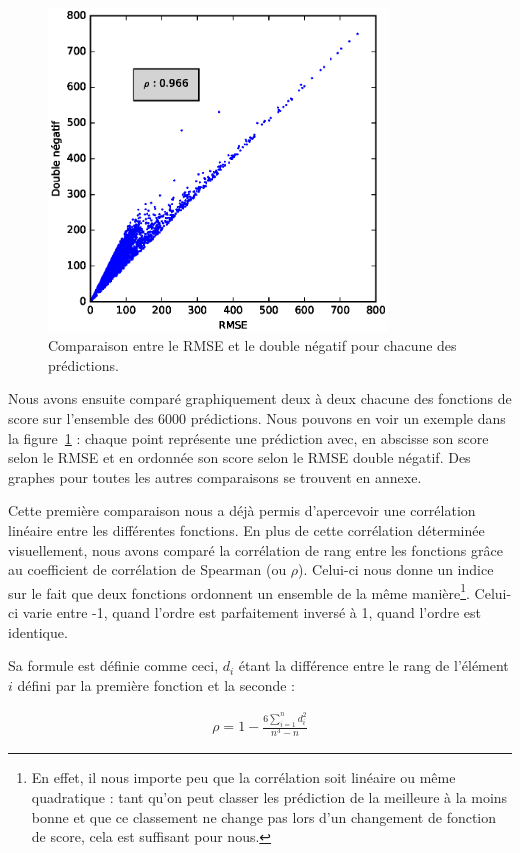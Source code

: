 \documentclass[letterpaper]{article}
\begin{document}
\begin{figure}[h]
   \centerline{\includegraphics[width=9cm]{metrics.eps}}
   \caption{\label{fig:rmse-vs-double}Comparaison entre le RMSE et le double négatif pour chacune des prédictions.}
\end{figure}

Nous avons ensuite comparé graphiquement deux à deux chacune des fonctions de score sur l'ensemble des 6000 prédictions. Nous pouvons en voir un exemple dans la figure~\ref{fig:rmse-vs-double} : chaque point représente une prédiction avec, en abscisse son score selon le RMSE et en ordonnée son score selon le RMSE double négatif. Des graphes pour toutes les autres comparaisons se trouvent en annexe.

Cette première comparaison nous a déjà permis d'apercevoir une corrélation linéaire entre les différentes fonctions.
En plus de cette corrélation déterminée visuellement, nous avons comparé la corrélation de rang entre les fonctions grâce au coefficient de corrélation de Spearman (ou $\rho$). Celui-ci nous donne un indice sur le fait que deux fonctions ordonnent un ensemble de la même manière\footnote{En effet, il nous importe peu que la corrélation soit linéaire ou même quadratique : tant qu'on peut classer les prédiction de la meilleure à la moins bonne et que ce classement ne change pas lors d'un changement de fonction de score, cela est suffisant pour nous.}. Celui-ci varie entre -1, quand l'ordre est parfaitement inversé à 1, quand l'ordre est identique.

Sa formule est définie comme ceci, $d_i$ étant la différence entre le rang de l'élément $i$ défini par la première fonction et la seconde :

\begin{eqnarray}
\rho = 1 - \frac{6 \sum_{i=1}^{n} d^2_i}{n^3 - n}
\end{eqnarray}
\end{document}

